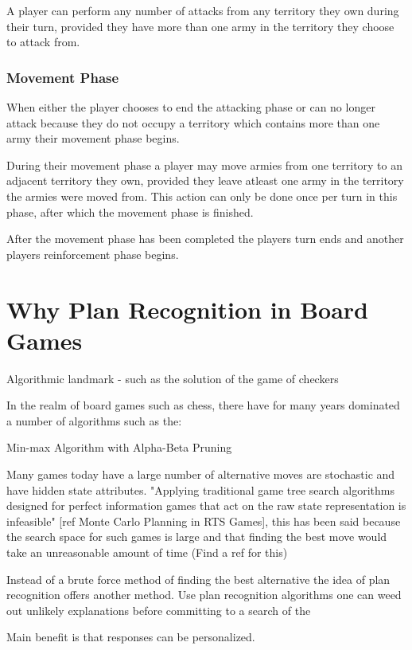 \documentclass[parskip]{cs4rep}
\begin{document}
A player can perform any number of attacks from any territory they own during their turn, provided they have more than one army in the territory they choose to attack from.

\subsubsection{Movement Phase}

When either the player chooses to end the attacking phase or can no longer attack because they do not occupy a territory which contains more than one army their movement phase begins.

During their movement phase a player may move armies from one territory to an adjacent territory they own, provided they leave atleast one army in the territory the armies were moved from. This action can only be done once per turn in this phase, after which the movement phase is finished.

After the movement phase has been completed the players turn ends and another players reinforcement phase begins.
\newpage

\section{Why Plan Recognition in Board Games}

Algorithmic landmark - such as the solution of the game of checkers 

In the realm of board games such as chess, there have for many years dominated a number of algorithms such as the:

Min-max Algorithm with Alpha-Beta Pruning

Many games today have a large number of alternative moves are stochastic and have hidden state attributes. "Applying traditional game tree search algorithms designed for perfect information games that act on the raw state representation is infeasible" [ref Monte Carlo Planning in RTS Games], this has been said because the search space for such games is large and that finding the best move would take an unreasonable amount of time (Find a ref for this)

Instead of a brute force method of finding the best alternative the idea of plan recognition offers another method. Use plan recognition algorithms one can weed out unlikely explanations before committing to a search of the 

Main benefit is that responses can be personalized.
\end{document}

